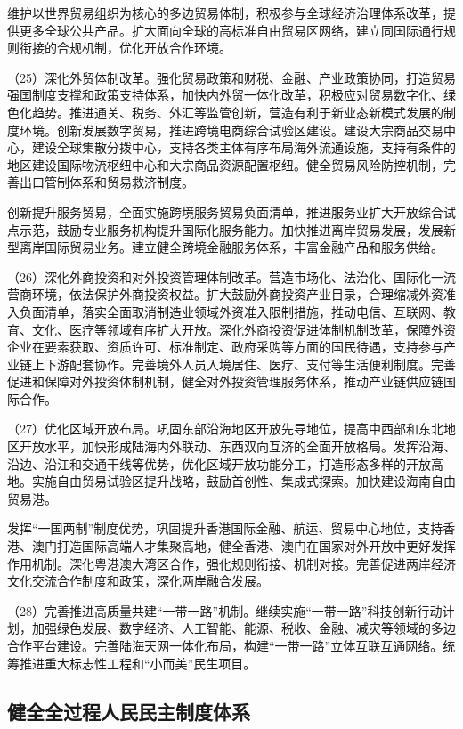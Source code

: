     维护以世界贸易组织为核心的多边贸易体制，积极参与全球经济治理体系改革，提供更多全球公共产品。扩大面向全球的高标准自由贸易区网络，建立同国际通行规则衔接的合规机制，优化开放合作环境。

    （25）深化外贸体制改革。强化贸易政策和财税、金融、产业政策协同，打造贸易强国制度支撑和政策支持体系，加快内外贸一体化改革，积极应对贸易数字化、绿色化趋势。推进通关、税务、外汇等监管创新，营造有利于新业态新模式发展的制度环境。创新发展数字贸易，推进跨境电商综合试验区建设。建设大宗商品交易中心，建设全球集散分拨中心，支持各类主体有序布局海外流通设施，支持有条件的地区建设国际物流枢纽中心和大宗商品资源配置枢纽。健全贸易风险防控机制，完善出口管制体系和贸易救济制度。

    创新提升服务贸易，全面实施跨境服务贸易负面清单，推进服务业扩大开放综合试点示范，鼓励专业服务机构提升国际化服务能力。加快推进离岸贸易发展，发展新型离岸国际贸易业务。建立健全跨境金融服务体系，丰富金融产品和服务供给。

    （26）深化外商投资和对外投资管理体制改革。营造市场化、法治化、国际化一流营商环境，依法保护外商投资权益。扩大鼓励外商投资产业目录，合理缩减外资准入负面清单，落实全面取消制造业领域外资准入限制措施，推动电信、互联网、教育、文化、医疗等领域有序扩大开放。深化外商投资促进体制机制改革，保障外资企业在要素获取、资质许可、标准制定、政府采购等方面的国民待遇，支持参与产业链上下游配套协作。完善境外人员入境居住、医疗、支付等生活便利制度。完善促进和保障对外投资体制机制，健全对外投资管理服务体系，推动产业链供应链国际合作。

    （27）优化区域开放布局。巩固东部沿海地区开放先导地位，提高中西部和东北地区开放水平，加快形成陆海内外联动、东西双向互济的全面开放格局。发挥沿海、沿边、沿江和交通干线等优势，优化区域开放功能分工，打造形态多样的开放高地。实施自由贸易试验区提升战略，鼓励首创性、集成式探索。加快建设海南自由贸易港。

    发挥“一国两制”制度优势，巩固提升香港国际金融、航运、贸易中心地位，支持香港、澳门打造国际高端人才集聚高地，健全香港、澳门在国家对外开放中更好发挥作用机制。深化粤港澳大湾区合作，强化规则衔接、机制对接。完善促进两岸经济文化交流合作制度和政策，深化两岸融合发展。

    （28）完善推进高质量共建“一带一路”机制。继续实施“一带一路”科技创新行动计划，加强绿色发展、数字经济、人工智能、能源、税收、金融、减灾等领域的多边合作平台建设。完善陆海天网一体化布局，构建“一带一路”立体互联互通网络。统筹推进重大标志性工程和“小而美”民生项目。

    \subsection{健全全过程人民民主制度体系}

